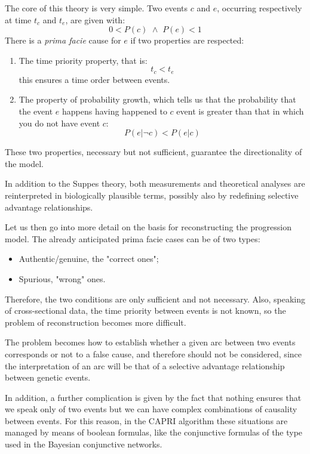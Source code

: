 The core of this theory is very simple. Two events $c$ and $e$, occurring respectively at time $t_c$ 
and $t_e$, are given with:
\begin{equation*}
    0 < P(c) \,\, \land \,\, P(e) < 1    
\end{equation*}
There is a \textit{prima facie} cause for $e$ if two properties are respected:
\begin{enumerate}
    \item The time priority property, that is:
        \begin{equation*}
            t_c < t_e
        \end{equation*}
        this ensures a time order between events.
    \item The property of probability growth, which tells us that the probability that the event $e$
        happens having happened to $c$ event is greater than that in which you do not have event $c$:
        \begin{equation*}
            P(e| \lnot c) < P(e|c)
        \end{equation*}
\end{enumerate}
These two properties, necessary but not sufficient, guarantee the directionality of the model.

In addition to the Suppes theory, both measurements and theoretical analyses are reinterpreted in
biologically plausible terms, possibly also by redefining selective advantage relationships. 

Let us then go into more detail on the basis for reconstructing the progression model. The already
anticipated prima facie cases can be of two types:
\begin{itemize}
    \item Authentic/genuine, the "correct ones";
    \item Spurious, "wrong" ones.
\end{itemize}
Therefore, the two conditions are only sufficient and not necessary. Also, speaking of cross-sectional
data, the time priority between events is not known, so the problem of reconstruction becomes more 
difficult. 

The problem becomes how to establish whether a given arc between two events corresponds or not to a 
false cause, and therefore should not be considered, since the interpretation of an arc will be that of 
a selective advantage relationship between genetic events.

In addition, a further complication is given by the fact that nothing ensures that we speak only of two
events but we can have complex combinations of causality between events. For this reason, in the CAPRI 
algorithm these situations are managed by means of boolean formulas, like the conjunctive formulas of 
the type used in the Bayesian conjunctive networks. 

